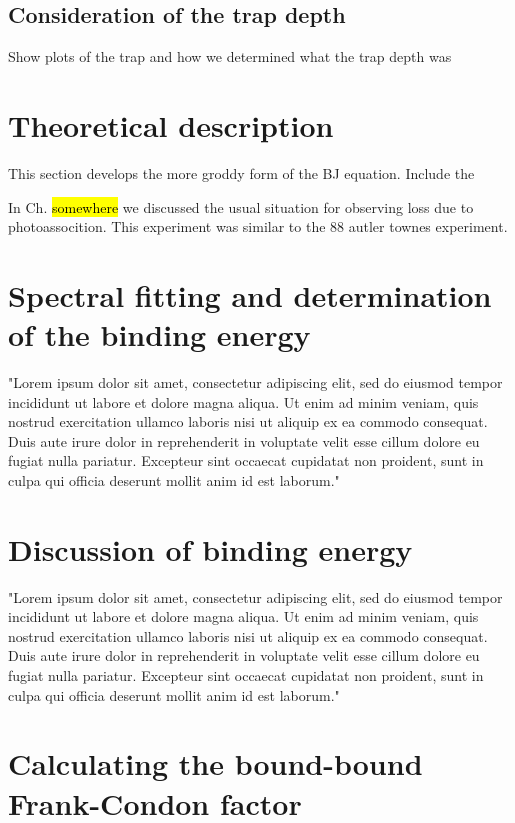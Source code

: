 \subsection{Consideration of the trap depth}
\label{sec:trunc_trap}

Show plots of the trap and how we determined what the trap depth was



\section{Theoretical description}
\label{sec:lowE_theory}

This section develops the more groddy form of the BJ equation. Include the 

In Ch. \hl{somewhere} we discussed the usual situation for observing loss due to photoassocition. This experiment was similar to the 88 autler townes experiment. 

\section{Spectral fitting and determination of the binding energy}
\label{sec:lowE_Eb2}

"Lorem ipsum dolor sit amet, consectetur adipiscing elit, sed do eiusmod tempor incididunt ut labore et dolore magna aliqua. Ut enim ad minim veniam, quis nostrud exercitation ullamco laboris nisi ut aliquip ex ea commodo consequat. Duis aute irure dolor in reprehenderit in voluptate velit esse cillum dolore eu fugiat nulla pariatur. Excepteur sint occaecat cupidatat non proident, sunt in culpa qui officia deserunt mollit anim id est laborum."

\section{Discussion of binding energy}
\label{sec:lowE_alt}

"Lorem ipsum dolor sit amet, consectetur adipiscing elit, sed do eiusmod tempor incididunt ut labore et dolore magna aliqua. Ut enim ad minim veniam, quis nostrud exercitation ullamco laboris nisi ut aliquip ex ea commodo consequat. Duis aute irure dolor in reprehenderit in voluptate velit esse cillum dolore eu fugiat nulla pariatur. Excepteur sint occaecat cupidatat non proident, sunt in culpa qui officia deserunt mollit anim id est laborum."

\section{Calculating the bound-bound Frank-Condon factor}
\label{sec:lowE_coupling}




